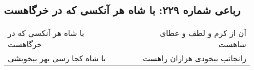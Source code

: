 \begin{center}
\section*{رباعی شماره ۲۲۹: با شاه هر آنکسی که در خرگاهست}
\label{sec:0229}
\begin{longtable}{l p{0.5cm} r}
با شاه هر آنکسی که در خرگاهست
&&
آن از کرم و لطف و عطای شاهست
\\
با شاه کجا رسی بهر بیخویشی
&&
زانجانب بیخودی هزاران راهست
\\
\end{longtable}
\end{center}
